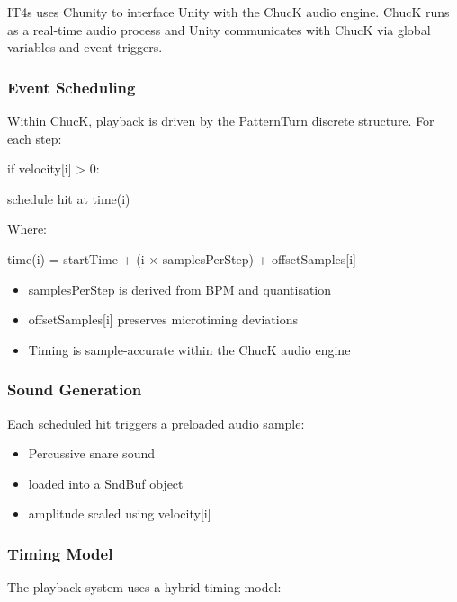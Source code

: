 IT4s uses Chunity to interface Unity with the ChucK audio engine. ChucK
runs as a real-time audio process and Unity communicates with ChucK via
global variables and event triggers.

\subsubsection{Event Scheduling}\label{event-scheduling}

Within ChucK, playback is driven by the PatternTurn discrete structure.
For each step:

if velocity{[}i{]} \textgreater{} 0:

schedule hit at time(i)

Where:

time(i) = startTime + (i × samplesPerStep) + offsetSamples{[}i{]}

\begin{itemize}
\item
  samplesPerStep is derived from BPM and quantisation
\item
  offsetSamples{[}i{]} preserves microtiming deviations
\item
  Timing is sample-accurate within the ChucK audio engine
\end{itemize}

\subsubsection{Sound Generation}\label{sound-generation}

Each scheduled hit triggers a preloaded audio sample:

\begin{itemize}
\item
  Percussive snare sound
\item
  loaded into a SndBuf object
\item
  amplitude scaled using velocity{[}i{]}
\end{itemize}

\subsubsection{Timing Model}\label{timing-model}

The playback system uses a hybrid timing model:

